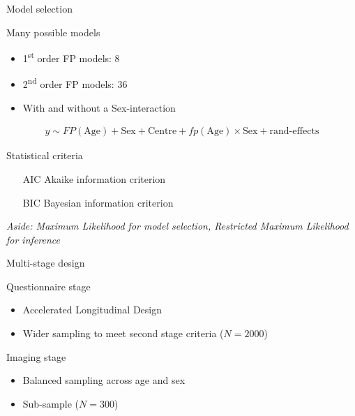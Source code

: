 \begin{frame}{Model selection}
  \begin{block}{Many possible models}
    \begin{itemize}
    \item 1\textsuperscript{st} order FP models: 8
    \item 2\textsuperscript{nd} order FP models: 36
    \item With and without a Sex-interaction
    \end{itemize}
    \begin{gather*}
      y \sim FP(\text{Age}) + \text{Sex} + \text{Centre} +
      fp(\text{Age})\times\text{Sex} + \text{rand-effects}
    \end{gather*}
  \end{block}%
  

  \pause

  \begin{block}{Statistical criteria}
    \begin{adjustbox}{minipage=0.7\textwidth,center}
      \begin{itemize}
      \item[AIC] Akaike information criterion
      \item[BIC] Bayesian information criterion
      \end{itemize}
    \end{adjustbox}

  \end{block}


  \emph{Aside: Maximum Likelihood for model selection, Restricted
    Maximum Likelihood for inference}
\end{frame}


\begin{frame}{Multi-stage design}
  
  \begin{block}{Questionnaire stage}
    \begin{itemize}
    \item Accelerated Longitudinal Design
    \item Wider sampling to meet second stage criteria ($N=2000$)
    \end{itemize}
  \end{block}

  \begin{block}{Imaging stage}
    \begin{itemize}
    \item Balanced sampling across age and sex
    \item Sub-sample ($N=300$)
    \end{itemize}
  \end{block}


\end{frame}

